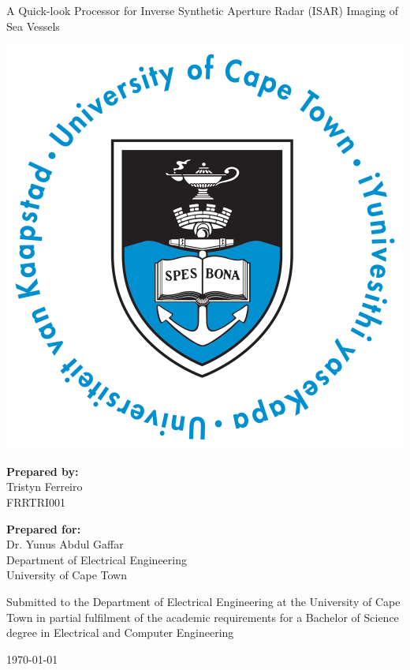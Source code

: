 \thispagestyle{empty}
\begin{center}
    
\Huge

\vspace{5cm}

A Quick-look Processor for Inverse Synthetic Aperture Radar (ISAR) Imaging of Sea Vessels
\vspace{0.5cm}
\hline
\vspace{1cm}

\includegraphics[width=0.5\linewidth]{FrontMatter/UCT_logo.png}

\vspace{1cm}

\large
\textbf{Prepared by:}\\
Tristyn Ferreiro\\
FRRTRI001

\vspace{1cm}

\textbf{Prepared for:}\\
Dr. Yunus Abdul Gaffar\\
Department of Electrical Engineering\\
University of Cape Town\\

\vspace{1cm}

\large
Submitted to the Department of Electrical Engineering at the University of Cape Town 
in partial fulfilment of the academic requirements for a 
Bachelor of Science degree in Electrical and Computer Engineering

\vspace{1cm}

\today





\end{center}